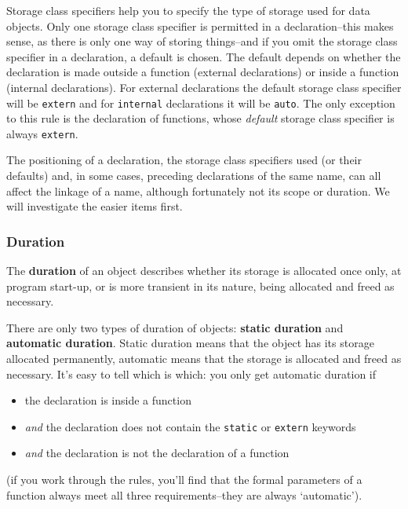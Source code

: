    Storage class specifiers help you to specify the type of storage used
    for data objects. Only one storage class specifier is permitted in
    a declaration--this makes sense, as there is only one way of storing
    things--and if you omit the storage class specifier in
    a declaration, a default is chosen. The default depends on whether the
    declaration is made outside a function (external declarations) or inside
    a function (internal declarations). For external declarations the
    default storage class specifier will be \texttt{extern} and for
    \texttt{internal} declarations it will be \texttt{auto}. The
    only exception to this rule is the declaration of functions, whose
    \textit{default} storage class specifier is always
    \texttt{extern}.


   The positioning of a declaration, the storage class specifiers used
    (or their defaults) and, in some cases, preceding declarations of the
    same name, can all affect the linkage of a name, although fortunately
    not its scope or duration. We will investigate the easier items
    first.


   \subsubsection{Duration}
    

    The \textbf{duration} of an object describes whether its storage is
     allocated once only, at program start-up, or is more transient in its
     nature, being allocated and freed as necessary.


    There are only two types of duration of objects: \textbf{static
     duration} and \textbf{automatic duration}. Static duration means
     that the object has its storage allocated permanently, automatic means
     that the storage is allocated and freed as necessary. It's easy to tell
     which is which: you only get automatic duration if


    \begin{itemize}
     \item the declaration is inside a function
     \item \textit{and} the declaration does not contain the
      \texttt{static} or \texttt{extern} keywords
     \item \textit{and} the declaration is not the declaration of a function
    \end{itemize}

    (if you work through the rules, you'll find that the formal
     parameters of a function always meet all three requirements--they
     are always `automatic').



